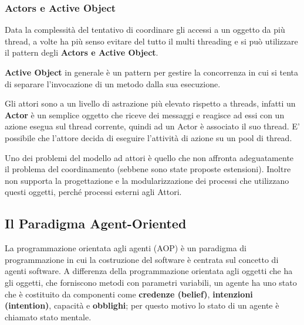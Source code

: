 \subsubsection{Actors e Active Object}
Data la complessità del tentativo di coordinare gli accessi a un oggetto da più thread, a volte ha più senso evitare del tutto il multi threading e si può utilizzare il pattern degli \textbf{Actors e Active Object}. 

\textbf{Active Object} in generale è un pattern per gestire la concorrenza in cui si tenta di separare l'invocazione di un metodo dalla sua esecuzione.

Gli attori sono a un livello di astrazione più elevato rispetto a threads, infatti un \textbf{Actor} è un semplice oggetto che riceve dei messaggi e reagisce ad essi con un azione esegua sul thread corrente, quindi ad un Actor è associato il suo thread. E' possibile che l'attore decida di eseguire l'attività di azione su un pool di thread.

Uno dei problemi del modello ad attori è quello che non affronta adeguatamente il problema del coordinamento (sebbene sono state proposte estensioni). Inoltre non supporta la progettazione e la modularizzazione dei processi che utilizzano questi oggetti, perché processi esterni agli Attori.

\subsection{Il Paradigma Agent-Oriented}
La programmazione orientata agli agenti (AOP) è un paradigma di programmazione in cui la costruzione del software è centrata sul concetto di agenti software. A differenza della programmazione orientata agli oggetti che ha gli oggetti, che forniscono metodi con parametri variabili, un agente ha uno stato che è costituito da componenti come \textbf{credenze (belief)}, \textbf{intenzioni (intention)}, capacità e \textbf{obblighi}; per questo motivo lo stato di un agente è chiamato stato mentale.

